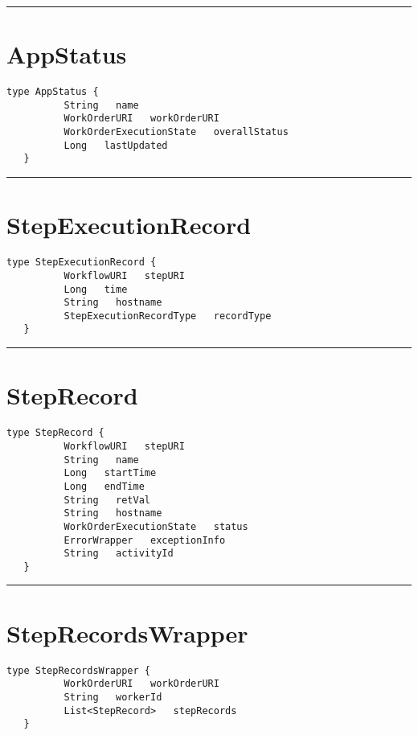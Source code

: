 \rule{12cm}{2pt}
\section{AppStatus}
\label{type:AppStatus}

\begin{lstlisting}[style=nonumbers]
   type AppStatus {
          String   name
          WorkOrderURI   workOrderURI
          WorkOrderExecutionState   overallStatus
          Long   lastUpdated
   }
\end{lstlisting}

\rule{12cm}{2pt}
\section{StepExecutionRecord}
\label{type:StepExecutionRecord}

\begin{lstlisting}[style=nonumbers]
   type StepExecutionRecord {
          WorkflowURI   stepURI
          Long   time
          String   hostname
          StepExecutionRecordType   recordType
   }
\end{lstlisting}

\rule{12cm}{2pt}
\section{StepRecord}
\label{type:StepRecord}

\begin{lstlisting}[style=nonumbers]
   type StepRecord {
          WorkflowURI   stepURI
          String   name
          Long   startTime
          Long   endTime
          String   retVal
          String   hostname
          WorkOrderExecutionState   status
          ErrorWrapper   exceptionInfo
          String   activityId
   }
\end{lstlisting}

\rule{12cm}{2pt}
\section{StepRecordsWrapper}
\label{type:StepRecordsWrapper}

\begin{lstlisting}[style=nonumbers]
   type StepRecordsWrapper {
          WorkOrderURI   workOrderURI
          String   workerId
          List<StepRecord>   stepRecords
   }
\end{lstlisting}

